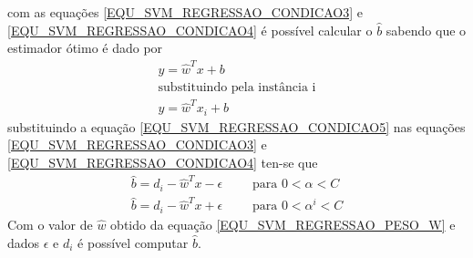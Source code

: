 com as equações \eqref{EQU_SVM_REGRESSAO_CONDICAO3} e \eqref{EQU_SVM_REGRESSAO_CONDICAO4} é possível calcular o \(\hat{b}\) sabendo que o estimador ótimo é dado por
\begin{align}
y = \hat{w}^{T}x + b \\
\nonumber\textrm{substituindo pela instância i} \\
y = \hat{w}^{T}x_{i} + b \label{EQU_SVM_REGRESSAO_CONDICAO5}
\end{align}
substituindo a equação \eqref{EQU_SVM_REGRESSAO_CONDICAO5} nas equações \eqref{EQU_SVM_REGRESSAO_CONDICAO3} e \eqref{EQU_SVM_REGRESSAO_CONDICAO4} ten-se que
\begin{align}
\hat{b} = d_{i} -\hat{w}^{T}x -\epsilon	\qquad \textrm{ para } 0 < \alpha < C		\label{EQU_SVM_REGRESSAO_CONDICAO6}\\
\hat{b} = d_{i} -\hat{w}^{T}x +\epsilon	\qquad \textrm{ para }  0 < \alpha^{i} < C	\label{EQU_SVM_REGRESSAO_CONDICAO7}
\end{align}
Com o valor de \(\hat{w}\) obtido da equação \eqref{EQU_SVM_REGRESSAO_PESO_W} e dados \(\epsilon\) e \(d_{i}\) é possível computar \(\hat{b}\).

